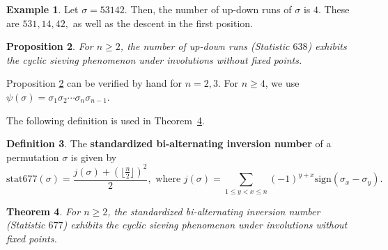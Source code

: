 \documentclass{amsart}
\newtheorem{thm}{Theorem}[section]
\newtheorem{prop}[thm]{Proposition}
\theoremstyle{definition}
\newtheorem{definition}[thm]{Definition}
\newtheorem{example}[thm]{Example}
\begin{document}
\begin{example}
  Let $\sigma = 53142$. Then, the number of up-down runs of $\sigma$ is $4$. These are $531, 14, 42,$ as well as the descent in the first position.
\end{example}

\begin{prop}\label{up-down_runs}
  For $n \geq 2$, the number of up-down runs (Statistic $638$) exhibits the cyclic sieving phenomenon under involutions without fixed points.
\end{prop}

Proposition \ref{up-down_runs} can be verified by hand for $n = 2, 3$. For $n \geq 4$, we use $\psi(\sigma) = \sigma_1\sigma_2 \dotsm \sigma_n \sigma_{n-1}$.

\smallskip
The following definition is used in Theorem~\ref{thm:bi_alt}. 
\begin{definition}
  The \textbf{standardized bi-alternating inversion number} of a permutation $\sigma$ is given by
  \[\textrm{stat677}(\sigma) = \frac{j(\sigma) + (\lfloor \frac{n}{2} \rfloor)^2}{2},
  \mbox{ where }
  j( \sigma) = \displaystyle \sum_{1 \leq y < x \leq n} (-1)^{y + x} \textrm{sign}(\sigma_x - \sigma_y).\]
\end{definition}


\begin{thm}\label{thm:bi_alt}
  For $n \geq 2$, the standardized bi-alternating inversion number (Statistic $677$) exhibits the cyclic sieving phenomenon under involutions without fixed points.
\end{thm}
\end{document}
